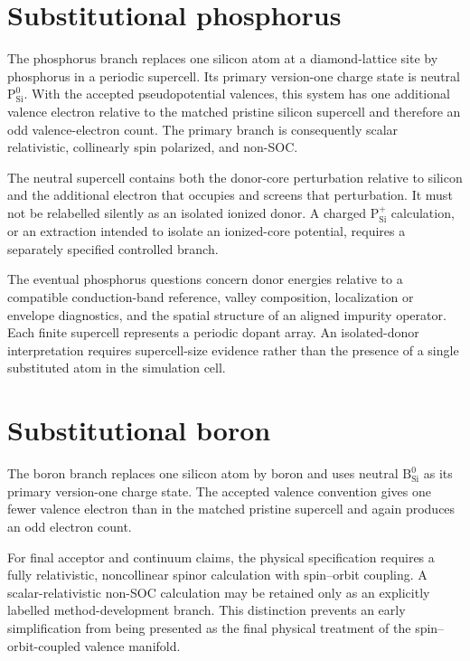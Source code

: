 \section{Substitutional phosphorus}

The phosphorus branch replaces one silicon atom at a diamond-lattice site by
phosphorus in a periodic supercell. Its primary version-one charge state is
neutral $\mathrm{P}_{\mathrm{Si}}^{0}$. With the accepted pseudopotential
valences, this system has one additional valence electron relative to the
matched pristine silicon supercell and therefore an odd valence-electron count.
The primary branch is consequently scalar relativistic, collinearly spin
polarized, and non-SOC.

The neutral supercell contains both the donor-core perturbation relative to
silicon and the additional electron that occupies and screens that
perturbation. It must not be relabelled silently as an isolated ionized donor.
A charged $\mathrm{P}_{\mathrm{Si}}^{+}$ calculation, or an extraction intended
to isolate an ionized-core potential, requires a separately specified
controlled branch.

The eventual phosphorus questions concern donor energies relative to a
compatible conduction-band reference, valley composition, localization or
envelope diagnostics, and the spatial structure of an aligned impurity
operator. Each finite supercell represents a periodic dopant array. An
isolated-donor interpretation requires supercell-size evidence rather than the
presence of a single substituted atom in the simulation cell.

\section{Substitutional boron}

The boron branch replaces one silicon atom by boron and uses neutral
$\mathrm{B}_{\mathrm{Si}}^{0}$ as its primary version-one charge state. The
accepted valence convention gives one fewer valence electron than in the
matched pristine supercell and again produces an odd electron count.

For final acceptor and continuum claims, the physical specification requires a
fully relativistic, noncollinear spinor calculation with spin--orbit coupling.
A scalar-relativistic non-SOC calculation may be retained only as an explicitly
labelled method-development branch. This distinction prevents an early
simplification from being presented as the final physical treatment of the
spin--orbit-coupled valence manifold.

